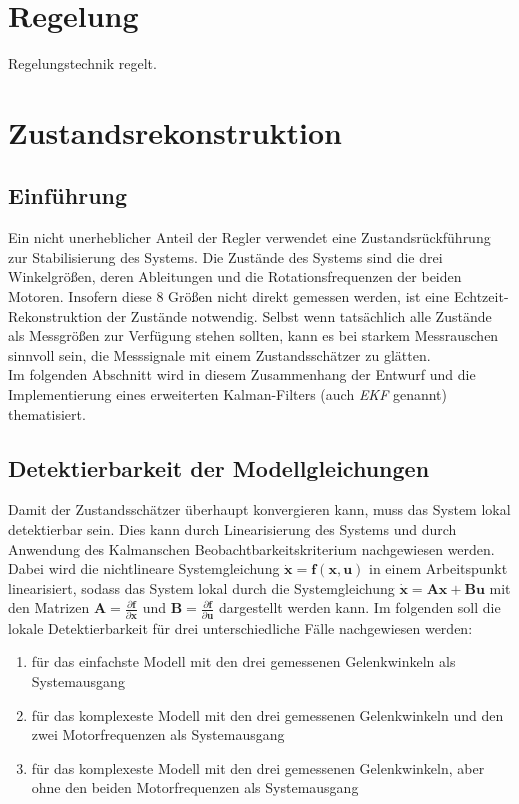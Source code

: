 \documentclass[times, 10pt,twocolumn]{article}
\begin{document}
	
	\section{Regelung}
	Regelungstechnik regelt. 
	
	\newpage
	\section{Zustandsrekonstruktion}
	\subsection{Einf\"uhrung}
	Ein nicht unerheblicher Anteil der Regler verwendet eine Zustandsr\"uckf\"uhrung zur Stabilisierung des Systems. Die Zust\"ande des Systems sind die drei Winkelgr\"oßen, deren Ableitungen und die Rotationsfrequenzen der beiden Motoren. Insofern diese 8 Gr\"oßen nicht direkt gemessen werden, ist eine Echtzeit-Rekonstruktion der Zustände notwendig. 
	Selbst wenn tatsächlich alle Zustände als Messgrößen zur Verfügung stehen sollten, kann es bei starkem Messrauschen sinnvoll sein, die Messsignale mit einem Zustandsschätzer zu glätten. \\
	Im folgenden Abschnitt wird in diesem Zusammenhang der Entwurf und die Implementierung eines erweiterten Kalman-Filters (auch \textit{EKF} genannt)  thematisiert. 
	\subsection{Detektierbarkeit der Modellgleichungen}
	Damit der Zustandsschätzer überhaupt konvergieren kann, muss das System lokal detektierbar sein. Dies kann durch Linearisierung des Systems und durch Anwendung des Kalmanschen Beobachtbarkeitskriterium nachgewiesen werden. Dabei wird die nichtlineare Systemgleichung  $ \bm{\dot x} = \bm{f}(\bm{x},\bm{u}) $ in einem Arbeitspunkt linearisiert, sodass das System lokal durch die Systemgleichung $ \bm{\dot x} = \bm{A} \bm{x} + \bm{B} \bm{u} $ mit den Matrizen $ \bm A = \frac{\partial{ \bm f}}{\partial{\bm x}} $ und $ \bm B = \frac{\partial{ \bm f}}{\partial{\bm u}} $ dargestellt werden kann. Im folgenden soll die lokale Detektierbarkeit für drei unterschiedliche Fälle nachgewiesen werden:
	\begin{enumerate}
	\item für das einfachste Modell mit den drei gemessenen Gelenkwinkeln als Systemausgang
	\item für das komplexeste Modell mit den drei gemessenen Gelenkwinkeln und den zwei Motorfrequenzen als Systemausgang
	\item für das komplexeste Modell mit den drei gemessenen Gelenkwinkeln, aber ohne den beiden Motorfrequenzen als Systemausgang
	\end{enumerate}
\end{document}

